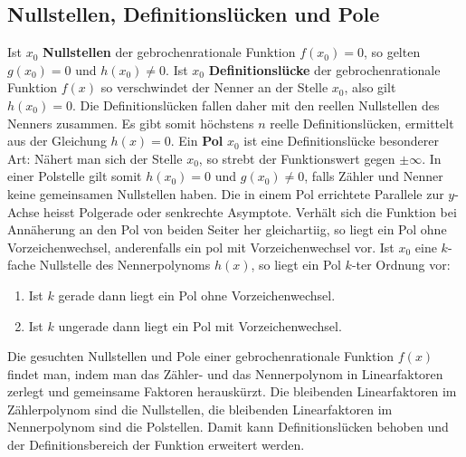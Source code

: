\subsection{Nullstellen, Definitionslücken und Pole}
Ist $x_0$ \textbf{Nullstellen} der gebrochenrationale Funktion $f\left(x_0\right)=0$, so gelten $g\left(x_0\right)=0$ und $h\left(x_0\right)\neq 0$.
\newline\newline
Ist $x_0$ \textbf{Definitionslücke} der gebrochenrationale Funktion $f\left(x\right)$ so verschwindet der Nenner an der Stelle $x_0$, also gilt $h\left(x_0\right)=0$. Die Definitionslücken fallen daher mit den reellen Nullstellen des Nenners zusammen. Es gibt somit höchstens $n$ reelle Definitionslücken, ermittelt aus der Gleichung $h\left(x\right)=0$.
\newline\newline
Ein \textbf{Pol} $x_0$ ist eine Definitionslücke besonderer Art: Nähert man sich der Stelle $x_0$, so strebt der Funktionswert gegen $\pm \infty$. In einer Polstelle gilt somit $h\left(x_0\right)=0$ und $g\left(x_0\right)\neq 0$, falls Zähler und Nenner keine gemeinsamen Nullstellen haben. Die in einem Pol errichtete Parallele zur $y$-Achse heisst Polgerade oder senkrechte Asymptote. Verhält sich die Funktion  bei Annäherung an den Pol von beiden Seiter her gleichartiig, so liegt ein Pol ohne Vorzeichenwechsel, anderenfalls ein pol mit Vorzeichenwechsel vor.
\newline\newline
Ist $x_0$ eine $k$-fache Nullstelle des Nennerpolynoms $h\left(x\right)$, so liegt ein Pol $k$-ter Ordnung vor: 
\begin{enumerate}[$(i)$]
\item Ist $k$ gerade dann liegt ein Pol ohne Vorzeichenwechsel.
\item Ist $k$ ungerade dann liegt ein Pol mit Vorzeichenwechsel. 
\end{enumerate}
Die gesuchten Nullstellen und Pole einer gebrochenrationale Funktion $f\left(x \right)$ findet man, indem man das Zähler- und das Nennerpolynom in Linearfaktoren zerlegt und gemeinsame Faktoren herauskürzt. Die bleibenden Linearfaktoren im Zählerpolynom sind die Nullstellen, die bleibenden Linearfaktoren im Nennerpolynom sind die Polstellen. Damit kann Definitionslücken behoben und der Definitionsbereich der Funktion erweitert werden.
